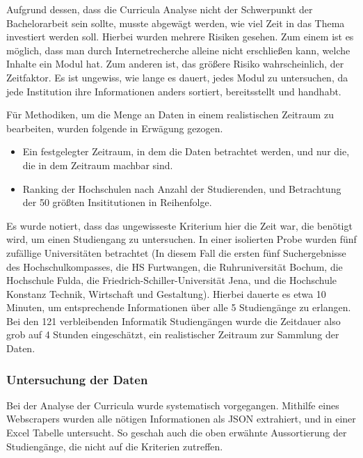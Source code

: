Aufgrund dessen, dass die Curricula Analyse nicht der Schwerpunkt der Bachelorarbeit sein sollte, musste abgewägt werden, wie viel Zeit in das Thema investiert werden soll.
Hierbei wurden mehrere Risiken gesehen. Zum einem ist es möglich, dass man durch Internetrecherche alleine nicht erschließen kann, welche Inhalte ein Modul hat. Zum anderen ist, das größere Risiko wahrscheinlich, der Zeitfaktor. Es ist ungewiss, wie lange es dauert, jedes Modul zu untersuchen, da jede Institution ihre Informationen anders sortiert, bereitsstellt und handhabt.

Für Methodiken, um die Menge an Daten in einem realistischen Zeitraum zu bearbeiten, wurden folgende in Erwägung gezogen.
\begin{itemize}
    \item Ein festgelegter Zeitraum, in dem die Daten betrachtet werden, und nur die, die in dem Zeitraum machbar sind.
    \item Ranking der Hochschulen nach Anzahl der Studierenden, und Betrachtung der 50 größten Insititutionen in Reihenfolge.
\end{itemize}

Es wurde notiert, dass das ungewisseste Kriterium hier die Zeit war, die benötigt wird, um einen Studiengang zu untersuchen. In einer isolierten Probe wurden fünf zufällige Universitäten betrachtet (In diesem Fall die ersten fünf Suchergebnisse des Hochschulkompasses, die HS Furtwangen, die Ruhruniversität Bochum, die Hochschule Fulda, die Friedrich-Schiller-Universität Jena, und die Hochschule Konstanz Technik, Wirtschaft und Gestaltung). Hierbei dauerte es etwa 10 Minuten, um entsprechende Informationen über alle 5 Studiengänge zu erlangen.
Bei den 121 verbleibenden Informatik Studiengängen wurde die Zeitdauer also grob auf 4 Stunden eingeschätzt, ein realistischer Zeitraum zur Sammlung der Daten.

\subsubsection{Untersuchung der Daten}
Bei der Analyse der Curricula wurde systematisch vorgegangen. Mithilfe eines Webscrapers wurden alle nötigen Informationen als JSON extrahiert, und in einer Excel Tabelle untersucht. So geschah auch die oben erwähnte Aussortierung der Studiengänge, die nicht auf die Kriterien zutreffen.
